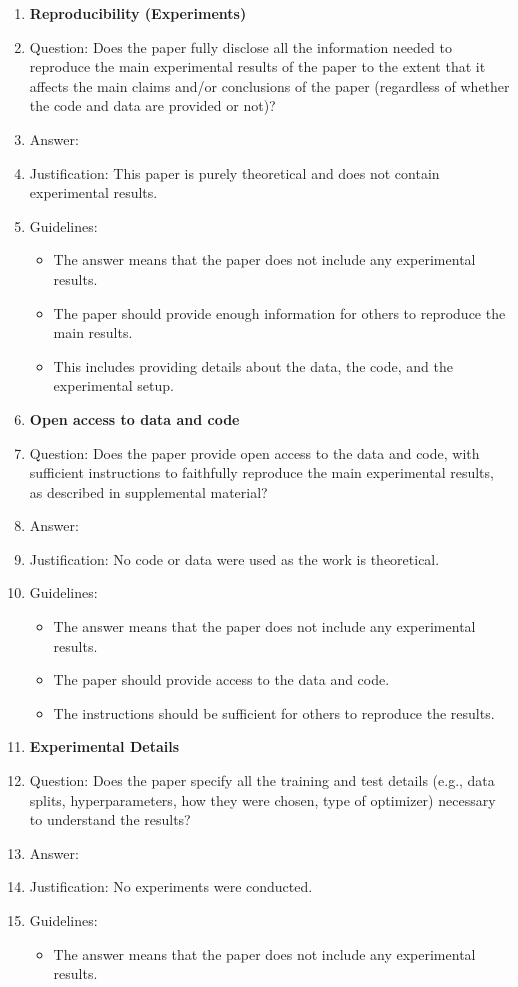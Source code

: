 \begin{enumerate}
\item {\bf Reproducibility (Experiments)}
    \item[] Question: Does the paper fully disclose all the information needed to reproduce the main experimental results of the paper to the extent that it affects the main claims and/or conclusions of the paper (regardless of whether the code and data are provided or not)?
    \item[] Answer: \answerNA{}
    \item[] Justification: This paper is purely theoretical and does not contain experimental results.
    \item[] Guidelines:
    \begin{itemize}
        \item The answer \answerNA{} means that the paper does not include any experimental results.
        \item The paper should provide enough information for others to reproduce the main results. 
        \item This includes providing details about the data, the code, and the experimental setup. 
    \end{itemize}

\item {\bf Open access to data and code}
    \item[] Question: Does the paper provide open access to the data and code, with sufficient instructions to faithfully reproduce the main experimental results, as described in supplemental material?
    \item[] Answer: \answerNA{}
    \item[] Justification: No code or data were used as the work is theoretical.
    \item[] Guidelines:
    \begin{itemize}
        \item The answer \answerNA{} means that the paper does not include any experimental results.
        \item The paper should provide access to the data and code. 
        \item The instructions should be sufficient for others to reproduce the results. 
    \end{itemize}

\item {\bf Experimental Details}
    \item[] Question: Does the paper specify all the training and test details (e.g., data splits, hyperparameters, how they were chosen, type of optimizer) necessary to understand the results?
    \item[] Answer: \answerNA{}
    \item[] Justification: No experiments were conducted.
    \item[] Guidelines:
    \begin{itemize}
        \item The answer \answerNA{} means that the paper does not include any experimental results.
    \end{itemize}


\end{enumerate}
